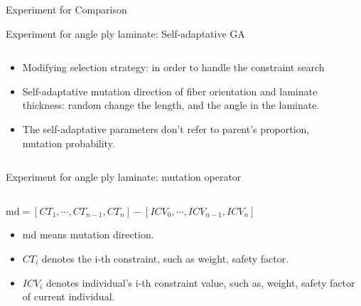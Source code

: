 \documentclass{beamer}
\begin{document}
\begin{frame}{Experiment for Comparison}
	
\end{frame}


\begin{frame}{Experiment for angle ply laminate: Self-adaptative GA}
    \begin{columns}[c]
    \begin{column}{1\textwidth}
		\begin{itemize}
			\item Modifying selection strategy: in order to handle the constraint search
			\item Self-adaptative mutation direction of fiber orientation and laminate thickness:
				random change the length, and the angle in the laminate.
			\item The self-adaptative parameters don't refer to parent's proportion, mutation
				probability.
		\end{itemize}
    \end{column}
    \begin{column}{0.8\textwidth}

    \end{column}
\end{columns}
\end{frame}


\begin{frame}{Experiment for angle ply laminate:  mutation operator}
    \begin{columns}[c]
    \begin{column}{1\textwidth}
		$\text{md} = [CT_1, \cdots, CT_{n-1}, CT_n] -  [ICV_0, \cdots, ICV_{n-1},
		ICV_n]$ \\
		\begin{itemize}
			\item  md means mutation direction.
			\item  $CT_i$ denotes the i-th constraint, such as weight, safety factor.
			\item  $ICV_i$ denotes individual's i-th constraint value, such as,  weight, safety
				factor of current individual.
		\end{itemize}

    \end{column}
\end{columns}
\end{frame}
\end{document}
